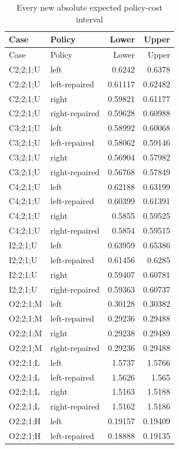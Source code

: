 {\small
\setlength{\tabcolsep}{3pt}
\begin{longtable}{@{}llrr@{}}
\caption{Every new absolute expected policy-cost interval}\label{tab:all-costs50}\\
\toprule
Case & Policy & Lower & Upper \\
\midrule
\endfirsthead
\toprule
Case & Policy & Lower & Upper \\
\midrule
\endhead
\bottomrule
\endfoot
C2;2;1;U & left & 0.6242 & 0.6378 \\
C2;2;1;U & left-repaired & 0.61117 & 0.62482 \\
C2;2;1;U & right & 0.59821 & 0.61177 \\
C2;2;1;U & right-repaired & 0.59628 & 0.60988 \\
C3;2;1;U & left & 0.58992 & 0.60068 \\
C3;2;1;U & left-repaired & 0.58062 & 0.59146 \\
C3;2;1;U & right & 0.56904 & 0.57982 \\
C3;2;1;U & right-repaired & 0.56768 & 0.57849 \\
C4;2;1;U & left & 0.62188 & 0.63199 \\
C4;2;1;U & left-repaired & 0.60399 & 0.61391 \\
C4;2;1;U & right & 0.5855 & 0.59525 \\
C4;2;1;U & right-repaired & 0.5854 & 0.59515 \\
I2;2;1;U & left & 0.63959 & 0.65386 \\
I2;2;1;U & left-repaired & 0.61456 & 0.6285 \\
I2;2;1;U & right & 0.59407 & 0.60781 \\
I2;2;1;U & right-repaired & 0.59363 & 0.60737 \\
O2;2;1;M & left & 0.30128 & 0.30382 \\
O2;2;1;M & left-repaired & 0.29236 & 0.29488 \\
O2;2;1;M & right & 0.29238 & 0.29489 \\
O2;2;1;M & right-repaired & 0.29236 & 0.29488 \\
O2;2;1;L & left & 1.5737 & 1.5766 \\
O2;2;1;L & left-repaired & 1.5626 & 1.565 \\
O2;2;1;L & right & 1.5163 & 1.5188 \\
O2;2;1;L & right-repaired & 1.5162 & 1.5186 \\
O2;2;1;H & left & 0.19157 & 0.19409 \\
O2;2;1;H & left-repaired & 0.18888 & 0.19135 \\

\end{longtable}}
